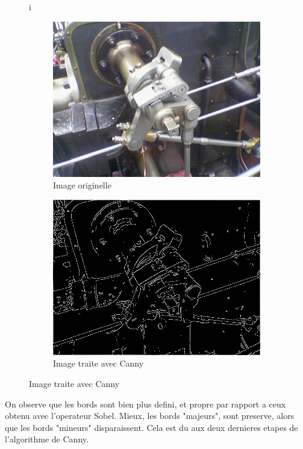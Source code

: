 \documentclass[a4paper, 12pt, titlepage, oneside]{article}
\begin{document}
	\begin{figure}[!h]i %
		\centering
		\begin{subfigure}[b]{0.4\linewidth}
			\includegraphics[width=\linewidth]{ValveOriginal.png}
			\caption{Image originelle}
		\end{subfigure}
		\begin{subfigure}[b]{0.4\linewidth}
			\includegraphics[width=\linewidth]{ValveCanny.png}
			\caption{Image traite avec Canny}
		\end{subfigure}
		\label{fig:cannyGood}
	\end{figure}
	On observe que les bords sont bien plus defini, et propre par rapport a ceux obtenu avec l'operateur Sobel. Mieux, les bords "majeurs", sont preserve, alors que les bords "mineurs" disparaissent. Cela est du aux deux dernieres etapes de l'algorithme de Canny.
\end{document}
